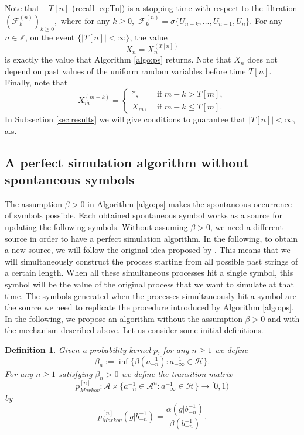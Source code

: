 \documentclass[a4paper]{article}
\newtheorem{definition}{Definition}%
\newcommand{\Z}{\mathbb{Z}}
\renewcommand{\H}{\mathcal{H}}
\newcommand{\A}{\mathcal{A}}
\begin{document}
Note that $-T[n]$ (recall \eqref{eq:Tn}) is a stopping time with respect to the filtration $ ({\mathcal F}_k^{(n)})_{k \geq 0}, $ where for any $ k \geq 0,$ ${\mathcal F}_k^{(n)} = \sigma \{ U_{n-k}, \ldots, U_{n-1}, U_n \} . $ For any $n\in \Z$, on the event $\{|T[n]|<\infty\}$, the value
\begin{equation}
X_n=X_n^{(T[n])}
\end{equation}
is exactly the value that Algorithm \ref{algo:ps} returns. Note that $X_n$ does not depend on past values of the uniform random variables before time $ T[n].$ Finally, note that
$$
X_{m}^{(m-k)}=
\begin{cases}
*, &\text{ if } m-k>T[m],\\
X_m, &\text{ if } m-k\leq T[m].
\end{cases}
$$ 
In Subsection \ref{sec:results} we will give conditions to guarantee that $|T[n]|<\infty$, a.s.




\subsection{A perfect simulation algorithm without spontaneous symbols}

The assumption $\beta>0$ in Algorithm \ref{algo:ps} makes the spontaneous occurrence of symbols possible. Each obtained spontaneous symbol works as a source for updating the following symbols. Without assuming $\beta>0$, we need a different source in order to have a perfect simulation algorithm. In the following, to obtain a new source, we will follow the original idea proposed by \cite{cftp}. This means that we will simultaneously construct the process starting from all possible past strings of a certain length. When all these simultaneous processes hit a single symbol, this symbol will be the value of the original process that we want to simulate at that time. The symbols generated when the processes simultaneously hit a symbol are the source we need to replicate the procedure introduced by Algorithm \ref{algo:ps}. In the following, we propose an algorithm without the assumption $\beta>0$ and with the mechanism described above. Let us consider some initial definitions.



\begin{definition} \label{def:ptildeandpmarkov}
Given a probability kernel $p$, for any $n\geq 1$ we define 
$$
\beta_n  := \inf\{ \beta( a_{- n}^{-1}):  a_{-\infty}^{-1} \in \H\}.
$$
For any $n\geq 1$ satisfying $\beta_n >0 $ we define 
the transition matrix 
$$
p_{Markov}^{[n]}:\A\times\{a_{-n}^{-1}\in\A^n: a_{-\infty}^{-1}\in \H \}\to [0,1)
$$
by
$$
p_{Markov}^{[n]}(g|b_{-n}^{-1})=\frac{\alpha(g|b_{-n}^{-1})}{\beta(b_{-n}^{-1})}. $$
\end{definition}
\end{document}
